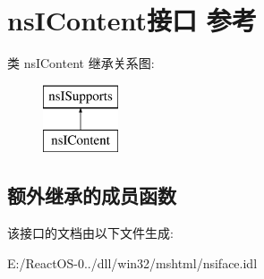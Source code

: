 \hypertarget{interfacens_i_content}{}\section{ns\+I\+Content接口 参考}
\label{interfacens_i_content}
类 ns\+I\+Content 继承关系图\+:\begin{figure}[H]
\begin{center}
\leavevmode
\includegraphics[height=2.000000cm]{interfacens_i_content}
\end{center}
\end{figure}
\subsection*{额外继承的成员函数}


该接口的文档由以下文件生成\+:\begin{DoxyCompactItemize}
\item 
E\+:/\+React\+O\+S-\/0../dll/win32/mshtml/nsiface.\+idl\end{DoxyCompactItemize}
